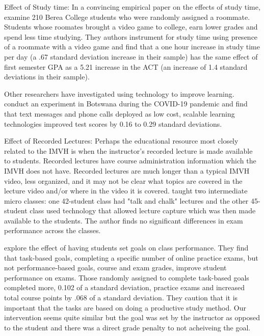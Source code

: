 \documentclass[12pt]{article}
\begin{document}
Effect of Study time: In a convincing empirical paper on the effects of study time, \textcite{ss2008} examine 210 Berea College students who were randomly assigned a roommate. Students whose roomates brought a video game to college, earn lower grades and spend less time studying. They authors instrument for study time using presence of a roommate with a video game and find that a one hour increase in study time per day (a .67 standard deviation increase in their sample) has the same effect of first semester GPA as a 5.21 increase in the ACT (an increase of 1.4 standard deviations in their sample).

Other researchers have investigated using technology to improve learning. \textcite{nbbm2020} conduct an experiment in Botswana during the COVID-19 pandemic and find that text messages and phone calls deployed as low cost, scalable learning technologies improved test scores by 0.16 to 0.29 standard deviations.

Effect of Recorded Lectures: Perhaps the educational resource most closely related to the IMVH is when the instructor's recorded lecture is made available to students. Recorded lectures have course administration information which the IMVH does not have. Recorded lectures are much longer than a typical IMVH video, less organized, and it may not be clear what topics are covered in the lecture video and/or where in the video it is covered. \textcite{savage2009} taught two intermediate micro classes: one 42-student class had "talk and chalk" lectures and the other 45-student class used technology that allowed lecture capture which was then made available to the students. The author finds no significant differences in exam performance across the classes.

\textcite{cgpr2020} explore the effect of having students set goals on class performance. They find that task-based goals, completing a specific number of online practice exams, but not performance-based goals, course and exam grades, improve student performance on exams. Those randomly assigned to complete task-based goals completed more, 0.102 of a standard deviation, practice exams and increased total course points by .068 of a standard deviation. They caution that it is important that the tasks are based on doing a productive study method. Our intervention seems quite similar but the goal was set by the instructor as opposed to the student and there was a direct grade penalty to not acheiveing the goal.
\end{document}
